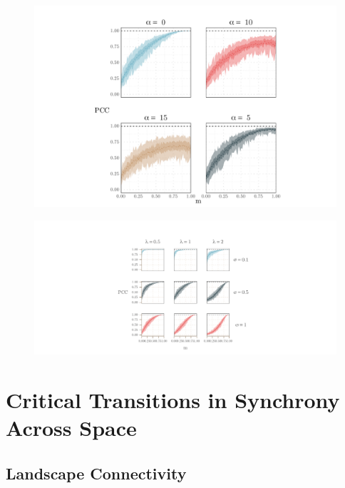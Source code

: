 \documentclass[]{article}
\begin{document}
\begin{figure}[h]
    \includegraphics[width=15cm]{figs/figure4}
    \caption{}
    \label{}
\end{figure}


\begin{figure}[h]
    \includegraphics[width=15cm]{figs/figure5}
    \caption{}
    \label{}
\end{figure}


\hypertarget{critical-transitions-across-space}{%
\section{Critical Transitions in Synchrony Across Space}\label{critical-transitions-across-space}}

\hypertarget{simulating-a-phase-transition-across-a-migration-gradient}{%
\subsection{Landscape Connectivity}\label{simulating-a-phase-transition-across-a-migration-gradient}}
\end{document}
